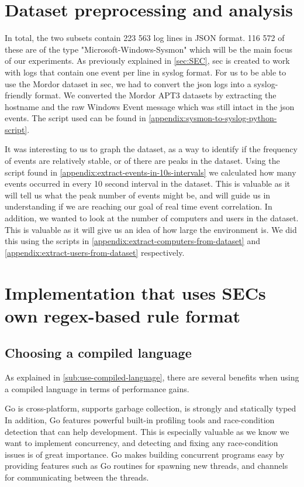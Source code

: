 \section{Dataset preprocessing and analysis}

In total, the two subsets contain 223 563 log lines in JSON format. 116 572 of these are of the type "Microsoft-Windows-Sysmon" which will be the main focus of our experiments.
As previously explained in \cref{sec:SEC}, \acrshort{sec} is created to work with logs that contain one event per line in syslog format. For us to be able to use the Mordor dataset in \acrshort{sec}, we had to convert the \acrshort{json} logs into a syslog-friendly format. We converted the Mordor APT3 datasets by extracting the hostname and the raw Windows Event message which was still intact in the \acrshort{json} events. The script used can be found in \cref{appendix:sysmon-to-syslog-python-script}. 

It was interesting to us to graph the dataset, as a way to identify if the frequency of events are relatively stable, or of there are peaks in the dataset. Using the script found in \cref{appendix:extract-events-in-10s-intervals} we calculated how many events occurred in every 10 second interval in the dataset. This is valuable as it will tell us what the peak number of events might be, and will guide us in understanding if we are reaching our goal of real time event correlation.
In addition, we wanted to look at the number of computers and users in the dataset. This is valuable as it will give us an idea of how large the environment is. We did this using the scripts in \cref{appendix:extract-computers-from-dataset} and \cref{appendix:extract-users-from-dataset} respectively.

\section{Implementation that uses SECs own regex-based rule format}

\subsection{Choosing a compiled language}

As explained in \cref{sub:use-compiled-language}, there are several benefits when using a compiled language in terms of performance gains.

Go \cite{golang} is cross-platform, supports garbage collection, is strongly and statically typed
In addition, Go features powerful built-in profiling tools and race-condition detection that can help development. This is especially valuable as we know we want to implement concurrency, and detecting and fixing any race-condition issues is of great importance.
Go makes building concurrent programs easy by providing features such as Go routines for spawning new threads, and channels for communicating between the threads.


